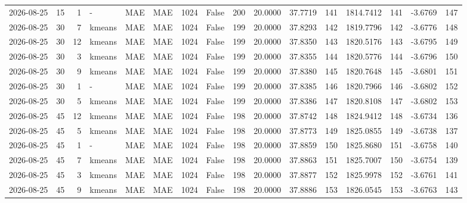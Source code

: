 \documentclass[10pt]{article}
\begin{document}
\begin{landscape}
\begin{longtable}{@{}lrrlllrcrrrrrrrr@{}}
2026-08-25 & 15 & 1 & - & MAE & MAE & 1024 & False & 200 & 20.0000 & 37.7719 & 141 & 1814.7412 & 141 & -3.6769 & 147 \\
2026-08-25 & 30 & 7 & kmeans & MAE & MAE & 1024 & False & 199 & 20.0000 & 37.8293 & 142 & 1819.7796 & 142 & -3.6776 & 148 \\
2026-08-25 & 30 & 12 & kmeans & MAE & MAE & 1024 & False & 199 & 20.0000 & 37.8350 & 143 & 1820.5176 & 143 & -3.6795 & 149 \\
2026-08-25 & 30 & 3 & kmeans & MAE & MAE & 1024 & False & 199 & 20.0000 & 37.8355 & 144 & 1820.5776 & 144 & -3.6796 & 150 \\
2026-08-25 & 30 & 9 & kmeans & MAE & MAE & 1024 & False & 199 & 20.0000 & 37.8380 & 145 & 1820.7648 & 145 & -3.6801 & 151 \\
2026-08-25 & 30 & 1 & - & MAE & MAE & 1024 & False & 199 & 20.0000 & 37.8385 & 146 & 1820.7966 & 146 & -3.6802 & 152 \\
2026-08-25 & 30 & 5 & kmeans & MAE & MAE & 1024 & False & 199 & 20.0000 & 37.8386 & 147 & 1820.8108 & 147 & -3.6802 & 153 \\
2026-08-25 & 45 & 12 & kmeans & MAE & MAE & 1024 & False & 198 & 20.0000 & 37.8742 & 148 & 1824.9412 & 148 & -3.6734 & 136 \\
2026-08-25 & 45 & 5 & kmeans & MAE & MAE & 1024 & False & 198 & 20.0000 & 37.8773 & 149 & 1825.0855 & 149 & -3.6738 & 137 \\
2026-08-25 & 45 & 1 & - & MAE & MAE & 1024 & False & 198 & 20.0000 & 37.8859 & 150 & 1825.8680 & 151 & -3.6758 & 140 \\
2026-08-25 & 45 & 7 & kmeans & MAE & MAE & 1024 & False & 198 & 20.0000 & 37.8863 & 151 & 1825.7007 & 150 & -3.6754 & 139 \\
2026-08-25 & 45 & 3 & kmeans & MAE & MAE & 1024 & False & 198 & 20.0000 & 37.8877 & 152 & 1825.9978 & 152 & -3.6761 & 141 \\
2026-08-25 & 45 & 9 & kmeans & MAE & MAE & 1024 & False & 198 & 20.0000 & 37.8886 & 153 & 1826.0545 & 153 & -3.6763 & 143 \\
\bottomrule
\end{longtable}
\clearpage

\end{landscape}
\end{document}
